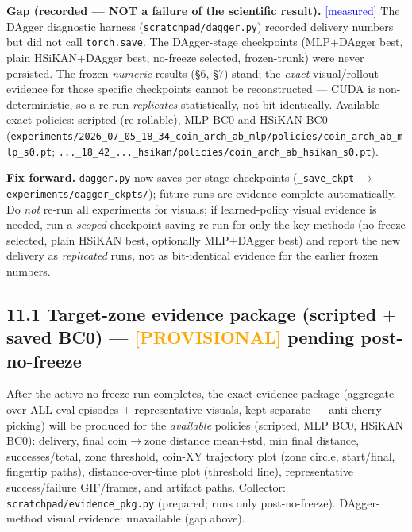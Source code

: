 \documentclass[11pt]{article}
\newcommand{\meas}{\textcolor{blue}{[measured]}}
\newcommand{\prov}{\textcolor{orange}{\textbf{[PROVISIONAL]}}}
\newcommand{\fn}[1]{\texttt{#1}}
\begin{document}
\textbf{Gap (recorded --- NOT a failure of the scientific result).} \meas{} The DAgger diagnostic harness
(\fn{scratchpad/dagger.py}) recorded delivery numbers but did not call \fn{torch.save}. The DAgger-stage
checkpoints (MLP$+$DAgger best, plain HSiKAN$+$DAgger best, no-freeze selected, frozen-trunk) were never
persisted. The frozen \emph{numeric} results (\S6, \S7) stand; the \emph{exact} visual/rollout evidence for those
specific checkpoints cannot be reconstructed --- CUDA is non-deterministic, so a re-run \emph{replicates}
statistically, not bit-identically. Available exact policies: scripted (re-rollable), MLP BC0 and HSiKAN BC0
(\fn{experiments/2026\_07\_05\_18\_34\_coin\_arch\_ab\_mlp/policies/coin\_arch\_ab\_mlp\_s0.pt};
\fn{...\_18\_42\_...\_hsikan/policies/coin\_arch\_ab\_hsikan\_s0.pt}).

\textbf{Fix forward.} \fn{dagger.py} now saves per-stage checkpoints (\fn{\_save\_ckpt} $\to$
\fn{experiments/dagger\_ckpts/}); future runs are evidence-complete automatically. Do \emph{not} re-run all
experiments for visuals; if learned-policy visual evidence is needed, run a \emph{scoped} checkpoint-saving
re-run for only the key methods (no-freeze selected, plain HSiKAN best, optionally MLP$+$DAgger best) and report
the new delivery as \emph{replicated} runs, not as bit-identical evidence for the earlier frozen numbers.

\subsection*{11.1 Target-zone evidence package (scripted $+$ saved BC0) --- \prov{} pending post-no-freeze}
After the active no-freeze run completes, the exact evidence package (aggregate over ALL eval episodes $+$
representative visuals, kept separate --- anti-cherry-picking) will be produced for the \emph{available} policies
(scripted, MLP BC0, HSiKAN BC0): delivery, final coin$\to$zone distance mean$\pm$std, min final distance,
successes/total, zone threshold, coin-XY trajectory plot (zone circle, start/final, fingertip paths),
distance-over-time plot (threshold line), representative success/failure GIF/frames, and artifact paths.
Collector: \fn{scratchpad/evidence\_pkg.py} (prepared; runs only post-no-freeze). DAgger-method visual evidence:
unavailable (gap above).
\end{document}
